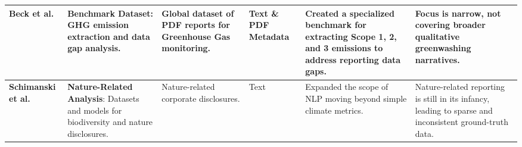 \begin{landscape}
\begin{table}[p]
\begin{tabularx}{\linewidth}{|p{1.8cm}|X|X|p{1.8cm}|X|X|}
\textbf{Beck et al.}  \parencite{jacob_beck_9548a833} & \textbf{Benchmark Dataset}: GHG emission extraction and data gap analysis. & Global dataset of PDF reports for Greenhouse Gas monitoring. & Text \& PDF Metadata & Created a specialized benchmark for extracting Scope 1, 2, and 3 emissions to address reporting data gaps. & Focus is narrow, not covering broader qualitative greenwashing narratives. \\ \hline
\textbf{Schimanski et al.}  \parencite{tobias_schimanski_3549ff9f} & \textbf{Nature-Related Analysis}: Datasets and models for biodiversity and nature disclosures. & Nature-related corporate disclosures. & Text & Expanded the scope of NLP moving beyond simple climate metrics. & Nature-related reporting is still in its infancy, leading to sparse and inconsistent ground-truth data. \\ \hline
\end{tabularx}
\end{table}
\end{landscape}



